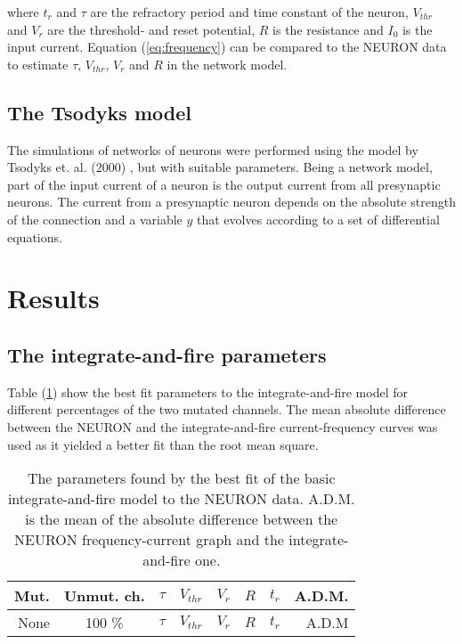 \documentclass[twocolumn, a4paper,10pt, norsk]{scrartcl}
\begin{document}
where $t_r$ and $\tau$ are the refractory period and time constant of the neuron, $V_{thr}$ and $V_{r}$ are the threshold- and reset potential, $R$ is the resistance and $I_0$ is the input current. Equation (\ref{eq:frequency}) can be compared to the NEURON data to estimate $\tau$, $V_{thr}$, $V_r$ and $R$ in the network model. %


\subsection*{The Tsodyks model}
The simulations of networks of neurons were performed using the model by Tsodyks et. al. (2000) \cite{Tsodyks}, but with suitable parameters. Being a network model, part of the input current of a neuron is the output current from all presynaptic neurons. %
The current from a presynaptic neuron depends on the absolute strength of the connection and a variable $y$ that evolves according to a set of differential equations.

\section*{Results}
\subsection*{The integrate-and-fire parameters}
Table (\ref{table:integrate-and-fire_parameters}) show the best fit parameters to the integrate-and-fire model for different percentages of the two mutated channels. The mean absolute difference between the NEURON and the integrate-and-fire current-frequency curves was used as it yielded a better fit than the root mean square.

\begin{table}
 \centering
 \caption{The parameters found by the best fit of the basic integrate-and-fire model to the NEURON data. A.D.M. is the mean of the absolute difference between the NEURON frequency-current graph and the integrate-and-fire one.}
 \begin{tabular}{r|c|r|r|r|r|r|r} %
  Mut. & Unmut. ch. & $\tau$ & $V_{thr}$ & $V_{r}$ & $R$ & $t_r$ & A.D.M.\\
  \hline
  None & 100 \% & $\tau$ & $V_{thr}$ & $V_{r}$ & $R$ & $t_r$ & A.D.M\\ %
 \end{tabular}
\label{table:integrate-and-fire_parameters}
\end{table}
\end{document}
